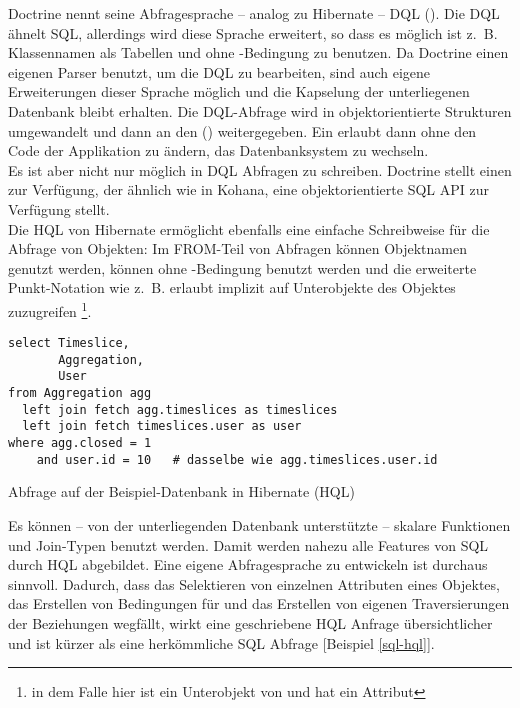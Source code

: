 \noindent Doctrine nennt seine Abfragesprache -- analog zu Hibernate -- DQL (). Die DQL ähnelt SQL, allerdings wird diese Sprache erweitert, so dass es möglich ist z.~B. Klassennamen als Tabellen und  ohne -Bedingung zu benutzen. Da Doctrine einen eigenen Parser benutzt, um die DQL zu bearbeiten, sind auch eigene Erweiterungen dieser Sprache möglich und die Kapselung der unterliegenen Datenbank bleibt erhalten. Die DQL-Abfrage wird in objektorientierte Strukturen umgewandelt und dann an den  () weitergegeben. Ein  erlaubt dann ohne den Code der Applikation zu ändern, das Datenbanksystem zu wechseln. \\
Es ist aber nicht nur möglich in DQL Abfragen zu schreiben. Doctrine stellt einen  zur Verfügung, der ähnlich wie in Kohana, eine objektorientierte SQL API zur Verfügung stellt.\\
Die HQL von Hibernate ermöglicht ebenfalls eine einfache Schreibweise für die Abfrage von Objekten: Im FROM-Teil von Abfragen können Objektnamen genutzt werden,  können ohne -Bedingung benutzt werden und die erweiterte Punkt-Notation wie z.~B.  erlaubt implizit auf Unterobjekte des Objektes zuzugreifen \footnote{in dem Falle hier ist  ein Unterobjekt von  und hat ein Attribut }. \\
\begin{fexample}
\lstset{style=SQL}
\begin{lstlisting}
select Timeslice,
       Aggregation,
       User
from Aggregation agg
  left join fetch agg.timeslices as timeslices
  left join fetch timeslices.user as user
where agg.closed = 1
    and user.id = 10   # dasselbe wie agg.timeslices.user.id
\end{lstlisting}
\caption{Abfrage auf der Beispiel-Datenbank in Hibernate (HQL)}
\end{fexample}
\noindent Es können -- von der unterliegenden Datenbank unterstützte -- skalare Funktionen und Join-Typen benutzt werden. Damit werden nahezu alle Features von SQL durch HQL abgebildet. Eine eigene Abfragesprache zu entwickeln ist durchaus sinnvoll. Dadurch, dass das Selektieren von einzelnen Attributen eines Objektes, das Erstellen von Bedingungen für  und das Erstellen von eigenen Traversierungen der Beziehungen wegfällt, wirkt eine geschriebene HQL Anfrage übersichtlicher und ist kürzer als eine herkömmliche SQL Abfrage [Beispiel \ref{sql-hql}].
